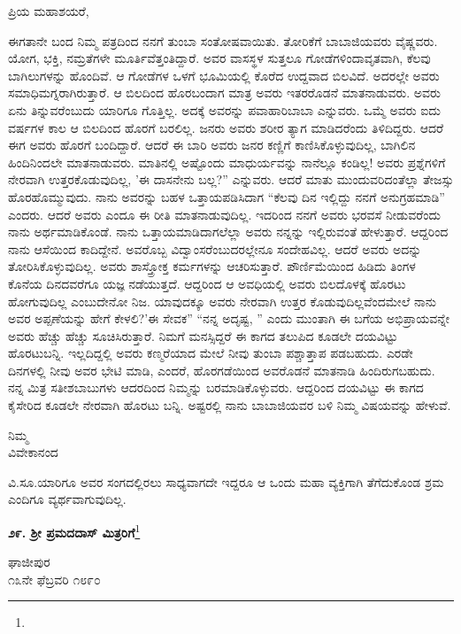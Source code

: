 \noindent
ಪ್ರಿಯ ಮಹಾಶಯರೆ,

ಈಗತಾನೇ ಬಂದ ನಿಮ್ಮ ಪತ್ರದಿಂದ ನನಗೆ ತುಂಬಾ ಸಂತೋಷವಾಯಿತು. ತೋರಿಕೆಗೆ ಬಾಬಾಜಿಯವರು ವೈಷ್ಣವರು. ಯೋಗ, ಭಕ್ತಿ, ನಮ್ರತೆಗಳೇ ಮೂರ್ತಿವೆತ್ತಂತಿದ್ದಾರೆ. ಅವರ ವಾಸಸ್ಥಳ ಸುತ್ತಲೂ ಗೋಡೆಗಳಿಂದಾವೃತವಾಗಿ, ಕೆಲವು ಬಾಗಿಲುಗಳನ್ನು ಹೊಂದಿವೆ. ಆ ಗೋಡೆಗಳ ಒಳಗೆ ಭೂಮಿಯಲ್ಲಿ ಕೊರೆದ ಉದ್ದವಾದ ಬಿಲವಿದೆ. ಅದರಲ್ಲೇ ಅವರು ಸಮಾಧಿಮಗ್ನರಾಗಿರುತ್ತಾರೆ. ಆ ಬಿಲದಿಂದ ಹೊರಬಂದಾಗ ಮಾತ್ರ ಅವರು ಇತರರೊಡನೆ ಮಾತನಾಡುವರು. ಅವರು ಏನು ತಿನ್ನುವರೆಂಬುದು ಯಾರಿಗೂ ಗೊತ್ತಿಲ್ಲ. ಅದಕ್ಕೆ ಅವರನ್ನು ಪವಾಹಾರಿಬಾಬಾ ಎನ್ನುವರು. ಒಮ್ಮೆ ಅವರು ಐದು ವರ್ಷಗಳ ಕಾಲ ಆ ಬಿಲದಿಂದ ಹೊರಗೆ ಬರಲಿಲ್ಲ. ಜನರು ಅವರು ಶರೀರ ತ್ಯಾಗ ಮಾಡಿದರೆಂದು ತಿಳಿದಿದ್ದರು. ಆದರೆ ಈಗ ಅವರು ಹೊರಗೆ ಬಂದಿದ್ದಾರೆ. ಆದರೆ ಈ ಬಾರಿ ಅವರು ಜನರ ಕಣ್ಣಿಗೆ ಕಾಣಿಸಿಕೊಳ್ಳುವುದಿಲ್ಲ, ಬಾಗಿಲಿನ ಹಿಂದಿನಿಂದಲೇ ಮಾತನಾಡುವರು. ಮಾತಿನಲ್ಲಿ ಅಷ್ಟೊಂದು ಮಾಧುರ್ಯವನ್ನು ನಾನೆಲ್ಲೂ ಕಂಡಿಲ್ಲ! ಅವರು ಪ್ರಶ್ನೆಗಳಿಗೆ ನೇರವಾಗಿ ಉತ್ತರಕೊಡುವುದಿಲ್ಲ, ’ಈ ದಾಸನೇನು ಬಲ್ಲ?” ಎನ್ನುವರು. ಆದರೆ ಮಾತು ಮುಂದುವರಿದಂತೆಲ್ಲಾ ತೇಜಸ್ಸು ಹೊರಹೊಮ್ಮುವುದು. ನಾನು ಅವರನ್ನು ಬಹಳ ಒತ್ತಾಯಪಡಿಸಿದಾಗ “ಕೆಲವು ದಿನ ಇಲ್ಲಿದ್ದು ನನಗೆ ಅನುಗ್ರಹಮಾಡಿ” ಎಂದರು. ಆದರೆ ಅವರು ಎಂದೂ ಈ ರೀತಿ ಮಾತನಾಡುವುದಿಲ್ಲ. ಇದರಿಂದ ನನಗೆ ಅವರು ಭರವಸೆ ನೀಡುವರೆಂದು ನಾನು ಅರ್ಥಮಾಡಿಕೊಂಡೆ. ನಾನು ಒತ್ತಾಯಮಾಡಿದಾಗಲೆಲ್ಲಾ ಅವರು ನನ್ನನ್ನು ಇಲ್ಲಿರುವಂತೆ ಹೇಳುತ್ತಾರೆ. ಆದ್ದರಿಂದ ನಾನು ಆಸೆಯಿಂದ ಕಾದಿದ್ದೇನೆ. ಅವರೊಬ್ಬ ವಿದ್ವಾಂಸರೆಂಬುದರಲ್ಲೇನೂ ಸಂದೇಹವಿಲ್ಲ. ಆದರೆ ಅವರು ಅದನ್ನು ತೋರಿಸಿಕೊಳ್ಳುವುದಿಲ್ಲ. ಅವರು ಶಾಸ್ತ್ರೋಕ್ತ ಕರ್ಮಗಳನ್ನು ಆಚರಿಸುತ್ತಾರೆ. ಪೌರ್ಣಿಮೆಯಿಂದ ಹಿಡಿದು ತಿಂಗಳ ಕೊನೆಯ ದಿನದವರೆಗೂ ಯಜ್ಞ ನಡೆಯುತ್ತದೆ. ಆದ್ದರಿಂದ ಆ ಅವಧಿಯಲ್ಲಿ ಅವರು ಬಿಲದೊಳಕ್ಕೆ ಹೊರಟು ಹೋಗುವುದಿಲ್ಲ ಎಂಬುದೇನೋ ನಿಜ. ಯಾವುದಕ್ಕೂ ಅವರು ನೇರವಾಗಿ ಉತ್ತರ ಕೊಡುವುದಿಲ್ಲವೆಂದಮೇಲೆ ನಾನು ಅವರ ಅಪ್ಪಣೆಯನ್ನು ಹೇಗೆ ಕೇಳಲಿ?’ಈ ಸೇವಕ” “ನನ್ನ ಅದೃಷ್ಟ, ” ಎಂದು ಮುಂತಾಗಿ ಈ ಬಗೆಯ ಅಭಿಪ್ರಾಯವನ್ನೇ ಅವರು ಹೆಚ್ಚು ಹೆಚ್ಚು ಸೂಚಿಸಿರುತ್ತಾರೆ. ನಿಮಗೆ ಮನಸ್ಸಿದ್ದರೆ ಈ ಕಾಗದ ತಲುಪಿದ ಕೂಡಲೇ ದಯವಿಟ್ಟು ಹೊರಟುಬನ್ನಿ. ಇಲ್ಲದಿದ್ದಲ್ಲಿ ಅವರು ಕಣ್ಮರೆಯಾದ ಮೇಲೆ ನೀವು ತುಂಬಾ ಪಶ್ಚಾತ್ತಾಪ ಪಡಬಹುದು. ಎರಡೇ ದಿನಗಳಲ್ಲಿ ನೀವು ಅವರ ಭೇಟಿ ಮಾಡಿ, ಎಂದರೆ, ಹೊರಗಡೆಯಿಂದ ಅವರೊಡನೆ ಮಾತನಾಡಿ ಹಿಂದಿರುಗಬಹುದು. ನನ್ನ ಮಿತ್ರ ಸತೀಶಬಾಬುಗಳು ಆದರದಿಂದ ನಿಮ್ಮನ್ನು ಬರಮಾಡಿಕೊಳ್ಳುವರು. ಆದ್ದರಿಂದ ದಯವಿಟ್ಟು ಈ ಕಾಗದ ಕೈಸೇರಿದ ಕೂಡಲೇ ನೇರವಾಗಿ ಹೊರಟು ಬನ್ನಿ. ಅಷ್ಟರಲ್ಲಿ ನಾನು ಬಾಬಾಜಿಯವರ ಬಳಿ ನಿಮ್ಮ ವಿಷಯವನ್ನು ಹೇಳುವೆ.
\vspace{-0.1cm}

{\flushright
ನಿಮ್ಮ\\ವಿವೇಕಾನಂದ\par}

ವಿ.ಸೂ.\enginline{-}ಯಾರಿಗೂ ಅವರ ಸಂಗದಲ್ಲಿರಲು ಸಾಧ್ಯವಾಗದೇ ಇದ್ದರೂ ಆ ಒಂದು ಮಹಾ ವ್ಯಕ್ತಿಗಾಗಿ ತೆಗೆದುಕೊಂಡ ಶ್ರಮ ಎಂದಿಗೂ ವ್ಯರ್ಥವಾಗುವುದಿಲ್ಲ.

\begin{center}
\textbf{೨೯. ಶ‍್ರೀ ಪ್ರಮದದಾಸ್ ಮಿತ್ರರಿಗೆ}\footnote{}
\end{center}

\begin{flushright}
ಘಾಜೀಪುರ\\೧೩ನೇ ಫೆಬ್ರವರಿ ೧೮೯೦
\end{flushright}

